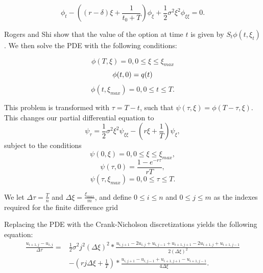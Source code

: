 \documentclass[12pt]{report}
\begin{document}
\begin{equation}
  \phi_t - ( (r-\delta)\xi + \frac{1}{t_0 + T} ) \phi_\xi + \frac{1}{2}\sigma^2\xi^2\phi_{\xi\xi} = 0.
\end{equation}

Rogers and Shi show that the value of the option at time \(t\) is given by \(S_t\phi(t, \xi_t)\). We then solve the PDE with the following conditions:

\begin{equation}
  \phi(T, \xi) = 0, 0 \le \xi \le \xi_{max}
\end{equation}
\begin{equation}
  \phi(t, 0) = q(t) \\
\end{equation}
\begin{equation}
  \phi(t, \xi_{max}) = 0, 0 \le t \le T.
\end{equation}

This problem is transformed with \(\tau = T - t \), such that \(\psi(\tau, \xi) = \phi(T-\tau, \xi)\). This changes our partial differential equation to
\begin{equation}
  \psi_\tau = \frac{1}{2}\sigma^2\xi^2\psi_{\xi\xi} - (r\xi + \frac{1}{T})\psi_\xi,
\end{equation}
subject to the conditions
\begin{equation}
  \psi(0, \xi) = 0, 0 \le \xi \le \xi_{max},
\end{equation}
\begin{equation}
  \psi(\tau, 0) = \frac{1-e^{-r\tau}}{rT},
\end{equation}
\begin{equation}
  \psi(\tau, \xi_{max}) = 0, 0 \le \tau \le T.
\end{equation}

We let \(\Delta\tau = \frac{T}{n}\) and \(\Delta\xi = \frac{\xi_{max}}{m}\), and define \(0 \le i \le n\) and \(0 \le j \le m\) as the indexes required for the finite difference grid

Replacing the PDE with the Crank-Nicholson discretizations yields the following equation:
\begin{equation}
  \begin{split}
    \frac{u_{i+1, j} - u_{i, j}}{\Delta\tau} = & \frac{1}{2}\sigma^2j^2(\Delta\xi)^2 * \frac{u_{i, j+1} - 2u_{i, j} + u_{i, j-1} + u_{i + 1, j+1} - 2 u_{i+1, j} + u_{i+1, j-1}}{2(\Delta\xi)^2} \\ & - (rj\Delta\xi + \frac{1}{T}) * \frac{u_{i, j+1} - u_{i,j-1} +u_{i+1, j+1} - u_{i+1, j-1}}{4\Delta\xi}.
  \end{split}
\end{equation}
\end{document}
